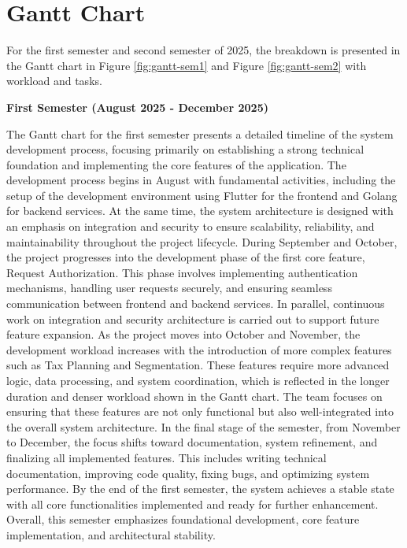 \documentclass[12pt,oneside,openright,a4paper]{cpe-english-project}
\begin{document}
\section{Gantt Chart}

For the first semester and second semester of 2025, the breakdown is
presented in the Gantt chart in Figure \ref{fig:gantt-sem1} and Figure \ref{fig:gantt-sem2} with workload and tasks.

\textbf{First Semester (August 2025 - December 2025)}

The Gantt chart for the first semester presents a detailed timeline of the system development process, focusing primarily on establishing a strong technical foundation and implementing the core features of the application. The development process begins in August with fundamental activities, including the setup of the development environment using Flutter for the frontend and Golang for backend services. At the same time, the system architecture is designed with an emphasis on integration and security to ensure scalability, reliability, and maintainability throughout the project lifecycle.
During September and October, the project progresses into the development phase of the first core feature, Request Authorization. This phase involves implementing authentication mechanisms, handling user requests securely, and ensuring seamless communication between frontend and backend services. In parallel, continuous work on integration and security architecture is carried out to support future feature expansion.
As the project moves into October and November, the development workload increases with the introduction of more complex features such as Tax Planning and Segmentation. These features require more advanced logic, data processing, and system coordination, which is reflected in the longer duration and denser workload shown in the Gantt chart. The team focuses on ensuring that these features are not only functional but also well-integrated into the overall system architecture.
In the final stage of the semester, from November to December, the focus shifts toward documentation, system refinement, and finalizing all implemented features. This includes writing technical documentation, improving code quality, fixing bugs, and optimizing system performance. By the end of the first semester, the system achieves a stable state with all core functionalities implemented and ready for further enhancement. Overall, this semester emphasizes foundational development, core feature implementation, and architectural stability.
\end{document}
